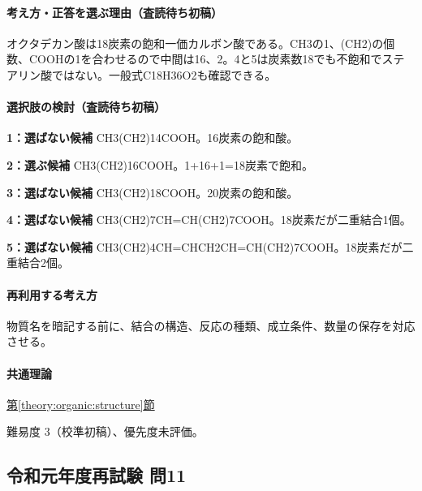 \paragraph{考え方・正答を選ぶ理由（査読待ち初稿）} オクタデカン酸は18炭素の飽和一価カルボン酸である。CH3の1、(CH2)の個数、COOHの1を合わせるので中間は16、2。4と5は炭素数18でも不飽和でステアリン酸ではない。一般式C18H36O2も確認できる。

\paragraph{選択肢の検討（査読待ち初稿）}\mbox{}\par

\noindent\textbf{1：選ばない候補} CH3(CH2)14COOH。16炭素の飽和酸。\par

\noindent\textbf{2：選ぶ候補} CH3(CH2)16COOH。1+16+1=\allowbreak{}18炭素で飽和。\par

\noindent\textbf{3：選ばない候補} CH3(CH2)18COOH。20炭素の飽和酸。\par

\noindent\textbf{4：選ばない候補} CH3(CH2)7CH=\allowbreak{}CH(CH2)7COOH。18炭素だが二重結合1個。\par

\noindent\textbf{5：選ばない候補} CH3(CH2)4CH=\allowbreak{}CHCH2CH=\allowbreak{}CH(CH2)7COOH。18炭素だが二重結合2個。\par

\paragraph{再利用する考え方} 物質名を暗記する前に、結合の構造、反応の種類、成立条件、数量の保存を対応させる。

\paragraph{共通理論} \hyperref[theory:organic:structure]{第\ref*{theory:organic:structure}節}

\par 難易度 3（校準初稿）、優先度未評価。

\subsection{令和元年度再試験 問11}
\label{q:r01-ret-applied-11}

